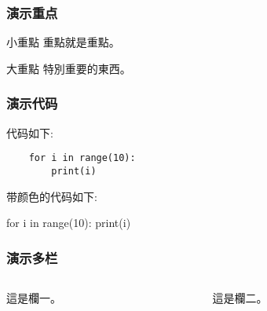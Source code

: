 \documentclass[xcolor=dvipsnames]{beamer}
\begin{document}
\begin{frame}
    \frametitle{演示重点}
    \begin{block}{小重點} 
        重點就是重點。 
    \end{block}

    \begin{alertblock}{大重點}
        特別重要的東西。 
    \end{alertblock} 
\end{frame}

\begin{frame}[fragile]
    \frametitle{演示代码}
    代码如下:
    \begin{verbatim} 
    for i in range(10): 
        print(i)
    \end{verbatim}
    带颜色的代码如下:
    \begin{semiverbatim} 
    for \alert{i} in range(10): 
        print(\alert{i})
    \end{semiverbatim} 
\end{frame}


\begin{frame}
    \frametitle{演示多栏}
    \begin{columns} 
        \begin{column}{5cm} 
            這是欄一。 
        \end{column}

        \begin{column}{5cm} 
            這是欄二。 
        \end{column}
    \end{columns}
\end{frame}
\end{document}
